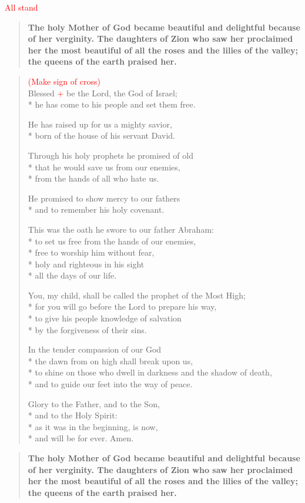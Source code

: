 \documentclass[letterpaper,14pt]{extarticle}
\newcommand{\side}[1]{\flagverse{\textcolor{red}{\textit{#1}}:}}
\newcommand{\rednote}[1]{\textcolor{red}{#1}}
\newlength{\oldindent}
\newcommand{\antiphon}[2]{
	\setlength{\oldindent}{\vindent}
	\setlength{\vindent}{0em}
	\begin{verse}
	\side{#1} \textbf{#2}
	\end{verse}
	\setlength{\vindent}{\oldindent}
}
\begin{document}
\rednote{All stand}
\antiphon{Leader}{The holy Mother of God became beautiful and delightful because of her verginity.  The daughters of Zion who saw her proclaimed her the most beautiful of all the roses and the lilies of the valley; the queens of the earth praised her.}
\begin{verse}
\rednote{(Make sign of cross)}\\
\side{All} Blessed \rednote{+} be the Lord, the God of Israel; \\*
he has come to his people and set them free.

He has raised up for us a mighty savior, \\*
born of the house of his servant David.

Through his holy prophets he promised of old \\*
  that he would save us from our enemies, \\*
  from the hands of all who hate us.

He promised to show mercy to our fathers \\*
and to remember his holy covenant.

This was the oath he swore to our father Abraham: \\*
to set us free from the hands of our enemies, \\*
free to worship him without fear, \\*
holy and righteous in his sight \\*
   all the days of our life.

You, my child, shall be called the prophet of the Most High; \\*
for you will go before the Lord to prepare his way, \\*
to give his people knowledge of salvation \\*
by the forgiveness of their sins.

In the tender compassion of our God \\*
the dawn from on high shall break upon us, \\*
to shine on those who dwell in darkness and the shadow of death, \\*
and to guide our feet into the way of peace.

Glory to the Father, and to the Son, \\*
and to the Holy Spirit: \\*
as it was in the beginning, is now, \\*
and will be for ever. Amen.
\end{verse}
\antiphon{All}{The holy Mother of God became beautiful and delightful because of her verginity.  The daughters of Zion who saw her proclaimed her the most beautiful of all the roses and the lilies of the valley; the queens of the earth praised her.}
\end{document}

